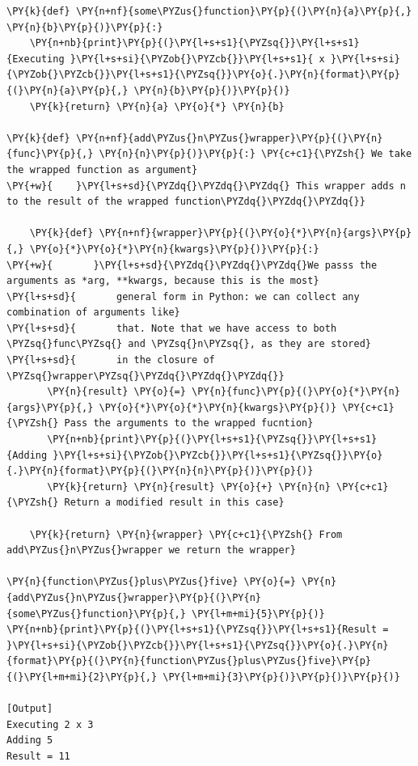 \begin{Verbatim}[label=\makebox{\url{https://github.com/lucabaldini/cmepda/tree/master/slides/latex/snippets/wrapper.py}},commandchars=\\\{\}]
\PY{k}{def} \PY{n+nf}{some\PYZus{}function}\PY{p}{(}\PY{n}{a}\PY{p}{,} \PY{n}{b}\PY{p}{)}\PY{p}{:}
    \PY{n+nb}{print}\PY{p}{(}\PY{l+s+s1}{\PYZsq{}}\PY{l+s+s1}{Executing }\PY{l+s+si}{\PYZob{}\PYZcb{}}\PY{l+s+s1}{ x }\PY{l+s+si}{\PYZob{}\PYZcb{}}\PY{l+s+s1}{\PYZsq{}}\PY{o}{.}\PY{n}{format}\PY{p}{(}\PY{n}{a}\PY{p}{,} \PY{n}{b}\PY{p}{)}\PY{p}{)}
    \PY{k}{return} \PY{n}{a} \PY{o}{*} \PY{n}{b}
    
\PY{k}{def} \PY{n+nf}{add\PYZus{}n\PYZus{}wrapper}\PY{p}{(}\PY{n}{func}\PY{p}{,} \PY{n}{n}\PY{p}{)}\PY{p}{:} \PY{c+c1}{\PYZsh{} We take the wrapped function as argument}
\PY{+w}{    }\PY{l+s+sd}{\PYZdq{}\PYZdq{}\PYZdq{} This wrapper adds n to the result of the wrapped function\PYZdq{}\PYZdq{}\PYZdq{}}
    
    \PY{k}{def} \PY{n+nf}{wrapper}\PY{p}{(}\PY{o}{*}\PY{n}{args}\PY{p}{,} \PY{o}{*}\PY{o}{*}\PY{n}{kwargs}\PY{p}{)}\PY{p}{:} 
\PY{+w}{       }\PY{l+s+sd}{\PYZdq{}\PYZdq{}\PYZdq{}We passs the arguments as *arg, **kwargs, because this is the most}
\PY{l+s+sd}{       general form in Python: we can collect any combination of arguments like}
\PY{l+s+sd}{       that. Note that we have access to both \PYZsq{}func\PYZsq{} and \PYZsq{}n\PYZsq{}, as they are stored}
\PY{l+s+sd}{       in the closure of \PYZsq{}wrapper\PYZsq{}\PYZdq{}\PYZdq{}\PYZdq{}}
       \PY{n}{result} \PY{o}{=} \PY{n}{func}\PY{p}{(}\PY{o}{*}\PY{n}{args}\PY{p}{,} \PY{o}{*}\PY{o}{*}\PY{n}{kwargs}\PY{p}{)} \PY{c+c1}{\PYZsh{} Pass the arguments to the wrapped fucntion}
       \PY{n+nb}{print}\PY{p}{(}\PY{l+s+s1}{\PYZsq{}}\PY{l+s+s1}{Adding }\PY{l+s+si}{\PYZob{}\PYZcb{}}\PY{l+s+s1}{\PYZsq{}}\PY{o}{.}\PY{n}{format}\PY{p}{(}\PY{n}{n}\PY{p}{)}\PY{p}{)}
       \PY{k}{return} \PY{n}{result} \PY{o}{+} \PY{n}{n} \PY{c+c1}{\PYZsh{} Return a modified result in this case}
       
    \PY{k}{return} \PY{n}{wrapper} \PY{c+c1}{\PYZsh{} From add\PYZus{}n\PYZus{}wrapper we return the wrapper}

\PY{n}{function\PYZus{}plus\PYZus{}five} \PY{o}{=} \PY{n}{add\PYZus{}n\PYZus{}wrapper}\PY{p}{(}\PY{n}{some\PYZus{}function}\PY{p}{,} \PY{l+m+mi}{5}\PY{p}{)}
\PY{n+nb}{print}\PY{p}{(}\PY{l+s+s1}{\PYZsq{}}\PY{l+s+s1}{Result = }\PY{l+s+si}{\PYZob{}\PYZcb{}}\PY{l+s+s1}{\PYZsq{}}\PY{o}{.}\PY{n}{format}\PY{p}{(}\PY{n}{function\PYZus{}plus\PYZus{}five}\PY{p}{(}\PY{l+m+mi}{2}\PY{p}{,} \PY{l+m+mi}{3}\PY{p}{)}\PY{p}{)}\PY{p}{)}

[Output]
Executing 2 x 3
Adding 5
Result = 11
\end{Verbatim}